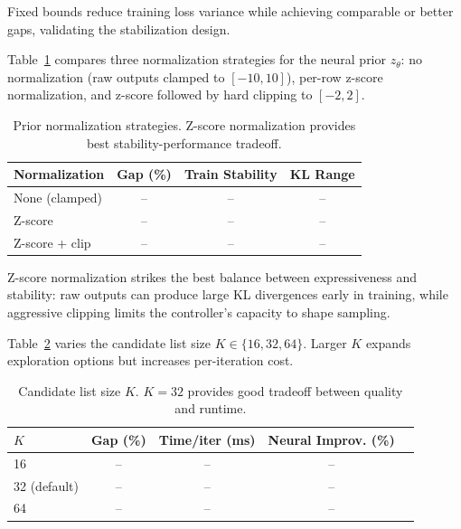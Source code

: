 \documentclass[sigconf,anonymous,review]{acmart}
\theoremstyle{definition}
\theoremstyle{plain}
\begin{document}
Fixed bounds reduce training loss variance while achieving comparable or better gaps, validating the stabilization design.

Table~\ref{tab:ablation-normalization} compares three normalization strategies for the neural prior $z_\theta$: no normalization (raw outputs clamped to $[-10,10]$), per-row z-score normalization, and z-score followed by hard clipping to $[-2,2]$.

\begin{table}[t]
\centering
\caption{Prior normalization strategies. Z-score normalization provides best stability-performance tradeoff.}
\label{tab:ablation-normalization}
\small
\begin{tabular}{lccc}
\toprule
Normalization & Gap (\%) & Train Stability & KL Range \\
\midrule
None (clamped) & -- & -- & -- \\
Z-score & -- & -- & -- \\
Z-score + clip & -- & -- & -- \\
\bottomrule
\end{tabular}
\end{table}

Z-score normalization strikes the best balance between expressiveness and stability: raw outputs can produce large KL divergences early in training, while aggressive clipping limits the controller's capacity to shape sampling.

Table~\ref{tab:ablation-k} varies the candidate list size $K \in \{16, 32, 64\}$.
Larger $K$ expands exploration options but increases per-iteration cost.

\begin{table}[t]
\centering
\caption{Candidate list size $K$. $K=32$ provides good tradeoff between quality and runtime.}
\label{tab:ablation-k}
\small
\begin{tabular}{lcccc}
\toprule
$K$ & Gap (\%) & Time/iter (ms) & Neural Improv. (\%) \\
\midrule
16 & -- & -- & -- \\
32 (default) & -- & -- & -- \\
64 & -- & -- & -- \\
\bottomrule
\end{tabular}
\end{table}
\end{document}
